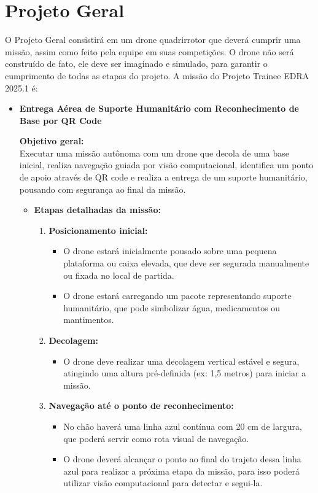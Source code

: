 \section{Projeto Geral}

O Projeto Geral consistirá em um drone quadrirrotor que deverá cumprir uma missão, assim como feito pela equipe em suas competições. O drone não será construído de fato, ele deve ser imaginado e simulado, para garantir o cumprimento de todas as etapas do projeto. A missão do Projeto Trainee EDRA 2025.1 é:

\begin{itemize}
    \item \textbf{Entrega Aérea de Suporte Humanitário com Reconhecimento de Base por QR Code}
    
    \textbf{Objetivo geral:} \\
    Executar uma missão autônoma com um drone que decola de uma base inicial, realiza navegação guiada por visão computacional, identifica um ponto de apoio através de QR code e realiza a entrega de um suporte humanitário, pousando com segurança ao final da missão.
    
    \begin{itemize}
        \item \textbf{Etapas detalhadas da missão:}
        
        \begin{enumerate}
            \item \textbf{Posicionamento inicial:}
            \begin{itemize}
                \item O drone estará inicialmente pousado sobre uma pequena plataforma ou caixa elevada, que deve ser segurada manualmente ou fixada no local de partida.
                \item O drone estará carregando um pacote representando suporte humanitário, que pode simbolizar água, medicamentos ou mantimentos.
            \end{itemize}
            
            \item \textbf{Decolagem:}
            \begin{itemize}
                \item O drone deve realizar uma decolagem vertical estável e segura, atingindo uma altura pré-definida (ex: 1,5 metros) para iniciar a missão.
            \end{itemize}
            
            \item \textbf{Navegação até o ponto de reconhecimento:}
            \begin{itemize}
                \item No chão haverá uma linha azul contínua{\color{red} com 20 cm de largura}, que poderá servir como rota visual de navegação.
                \item {\color{red}O drone deverá alcançar o ponto ao final do trajeto dessa linha azul para realizar a próxima etapa da missão, para isso poderá utilizar visão computacional para detectar e segui-la.}
            \end{itemize}
            

\end{enumerate}
\end{itemize}
\end{itemize}
